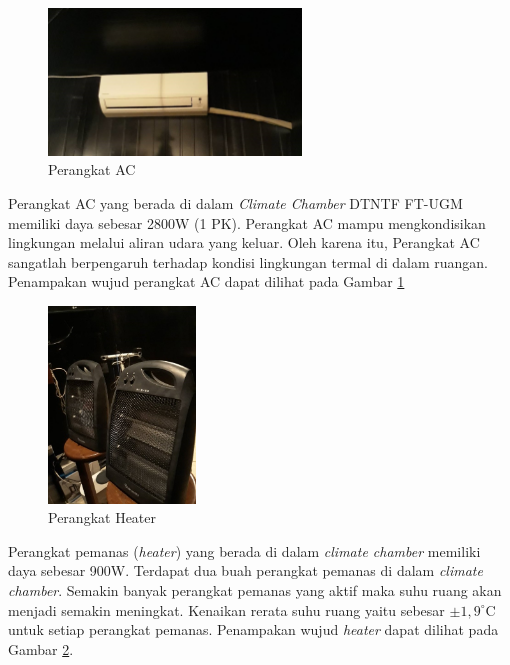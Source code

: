 \begin{figure}[!h]
	\centering
	\includegraphics[width=0.6\textwidth]{figures/AC}
	\caption{Perangkat AC}
	\label{fig:4:AC}
\end{figure}

Perangkat AC yang berada di dalam \textit{Climate Chamber} DTNTF FT-UGM memiliki daya sebesar 2800W (1 PK). Perangkat AC mampu mengkondisikan lingkungan melalui aliran udara yang keluar. Oleh karena itu, Perangkat AC sangatlah berpengaruh terhadap kondisi lingkungan termal di dalam ruangan. Penampakan wujud perangkat AC dapat dilihat pada Gambar \ref{fig:4:AC}

\begin{figure}[!h]
	\centering
	\includegraphics[width=0.35\textwidth]{figures/Heater}
	\caption{Perangkat Heater}
	\label{fig:4:Heater}
\end{figure}

Perangkat pemanas (\textit{heater}) yang berada di dalam \textit{climate chamber} memiliki daya sebesar 900W. Terdapat dua buah perangkat pemanas di dalam \textit{climate chamber}. Semakin banyak perangkat pemanas yang aktif maka suhu ruang akan menjadi semakin meningkat. Kenaikan rerata suhu ruang yaitu sebesar $\pm1,9^\circ$C untuk setiap perangkat pemanas. Penampakan wujud \textit{heater} dapat dilihat pada Gambar \ref{fig:4:Heater}.

